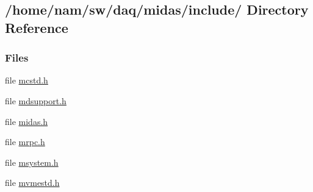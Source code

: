 \subsection{/home/nam/sw/daq/midas/include/ Directory Reference}
\label{dir_48b0044f510b49968094512d72dbfa74}
\subsubsection*{Files}
\begin{DoxyCompactItemize}
\item 
file \hyperlink{mcstd_8h}{mcstd.h}
\item 
file \hyperlink{mdsupport_8h}{mdsupport.h}
\item 
file \hyperlink{midas_8h}{midas.h}
\item 
file \hyperlink{mrpc_8h}{mrpc.h}
\item 
file \hyperlink{msystem_8h}{msystem.h}
\item 
file \hyperlink{mvmestd_8h}{mvmestd.h}
\end{DoxyCompactItemize}
